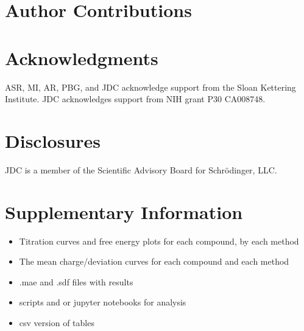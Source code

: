 \documentclass[9pt,lineno,final]{elife}
\begin{document}
\section{Author Contributions}


\section{Acknowledgments}

ASR, MI, AR, PBG, and JDC acknowledge support from the Sloan Kettering Institute.
JDC acknowledges support from NIH grant P30 CA008748.

\section{Disclosures}

JDC is a member of the Scientific Advisory Board for Schr\"{o}dinger, LLC.





\appendix

\section{Supplementary Information}



% 





\begin{itemize}
	\item Titration curves and free energy plots for each compound, by each method
	\item The mean charge/deviation curves for each compound and each method
	\item .mae and .sdf files with results
	\item scripts and or jupyter notebooks for analysis
	\item csv version of tables
\end{itemize}
\end{document}
